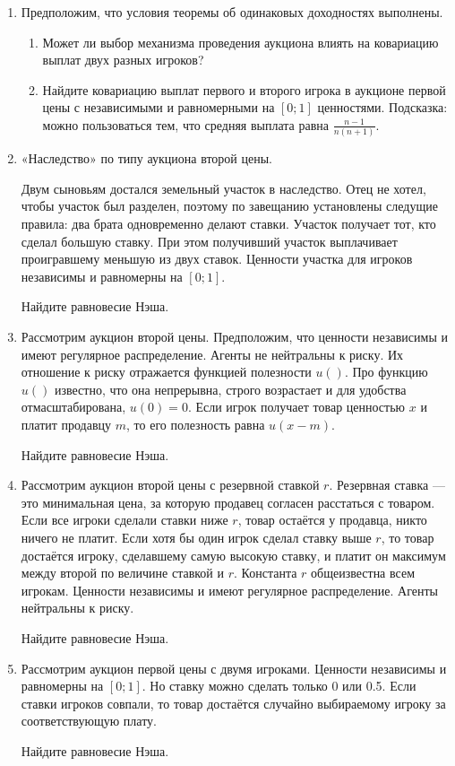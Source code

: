 

\begin{enumerate}
\item Предположим, что условия теоремы об одинаковых доходностях выполнены.
\begin{enumerate}
\item Может ли выбор механизма проведения аукциона влиять на ковариацию выплат двух разных игроков?
\item  Найдите ковариацию выплат первого и второго игрока в аукционе первой цены с независимыми и равномерными на $ [0;1] $ ценностями. Подсказка: можно пользоваться тем, что средняя выплата равна $ \frac{n-1}{n(n+1)} $.
\end{enumerate}


\item «Наследство» по типу аукциона второй цены.

Двум сыновьям достался земельный участок в наследство. Отец не хотел, чтобы участок был разделен, поэтому по завещанию установлены следущие правила: два брата одновременно делают ставки. Участок получает тот, кто сделал большую ставку. При этом получивший участок выплачивает проигравшему меньшую из двух ставок. Ценности участка для игроков независимы и равномерны на $ [0;1] $.

Найдите равновесие Нэша.


\item Рассмотрим аукцион второй цены. Предположим, что ценности независимы и имеют регулярное распределение. Агенты не нейтральны к риску. Их отношение к риску отражается функцией полезности $ u() $. Про функцию $ u() $ известно, что она непрерывна, строго возрастает и для удобства отмасштабирована, $ u(0)=0 $. Если игрок получает товар ценностью $ x $ и платит продавцу $ m $, то его полезность равна $ u(x-m) $.

Найдите равновесие Нэша.



\item Рассмотрим аукцион второй цены с резервной ставкой $ r $. Резервная ставка — это минимальная цена, за которую продавец согласен расстаться с товаром. Если все игроки сделали ставки ниже $ r $, товар остаётся у продавца, никто ничего не платит. Если хотя бы один игрок сделал ставку выше $ r $, то товар достаётся игроку, сделавшему самую высокую ставку, и платит он максимум между второй по величине ставкой и $ r $. Константа $ r $ общеизвестна всем игрокам. Ценности независимы и имеют регулярное распределение. Агенты нейтральны к риску.

Найдите равновесие Нэша.


\item Рассмотрим аукцион первой цены с двумя игроками. Ценности независимы и равномерны на $ [0;1] $. Но ставку можно сделать только 0 или 0.5. Если ставки игроков совпали, то товар достаётся случайно выбираемому игроку за соответствующую плату.

Найдите равновесие Нэша.

\end{enumerate}
